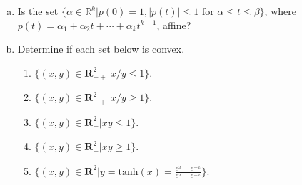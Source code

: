 \documentclass[a4paper]{article}
\begin{document}
\noindent
\begin{enumerate}[a)]
    \item Is the set $\{  \alpha \in \mathbb{R}^k | p(0)=1, |p(t)|\leq1 \text{ for } \alpha \leq t \leq \beta\}$, where $p(t) = \alpha_1+\alpha_2t+\cdots+\alpha_kt^{k-1}$, affine?
    \item Determine if each set below is convex.
        \begin{enumerate}[1)]
            \item $\{  (x,y)\in \mathbf{R}^2_{++} | x/y \leq 1 \}$.
            \item $\{  (x,y)\in \mathbf{R}^2_{++} | x/y \geq 1 \}$.
            \item $\{  (x,y)\in \mathbf{R}^2_{+} | xy \leq 1 \}$.
            \item $\{  (x,y)\in \mathbf{R}^2_{+} | xy \geq 1 \}$.
            \item $\{  (x,y)\in \mathbf{R}^2 | y = \text{tanh}(x) = \frac{e^{x}-e^{-x}}{e^{x}+e^{-x}}\}$.
        \end{enumerate}
\end{enumerate}
\end{document}
